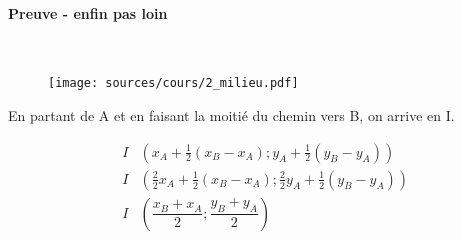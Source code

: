 \documentclass[paper=a4, fontsize=9pt]{scrartcl} %
\begin{document}
\begin{multicols}{2}

  \paragraph{Preuve - enfin pas loin}~~\\

  \begin{figure}[H]
    \centering
    \texttt{[image: sources/cours/2\_milieu.pdf]}
  \end{figure}

  En partant de A et en faisant la moitié du chemin vers B, on arrive en I.

  \begin{eqnarray*}
    &I&  \left( x_A + \frac{1}{2} (x_B - x_A) ; y_A + \frac{1}{2} (y_B - y_A )\right )\\
    &I& \left( \frac{2}{2} x_A + \frac{1}{2} (x_B - x_A) ; \frac{2}{2} y_A + \frac{1}{2} (y_B - y_A)\right )\\
    &I& \left(\dfrac{x_B + x_A}{2} ; \dfrac{y_B + y_A}{2}\right )\\
  \end{eqnarray*}

\end{multicols}
\end{document}
